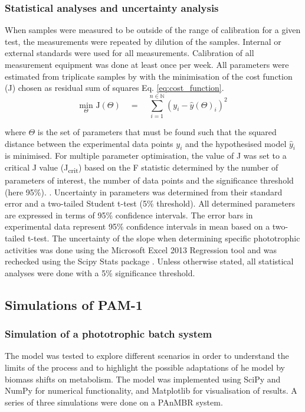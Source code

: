 \subsubsection{Statistical analyses and uncertainty analysis}
When samples were measured to be outside of the range of calibration for a given test, the measurements were repeated by dilution of the samples. Internal or external standards were used for all measurements. Calibration of all measurement equipment was done at least once per week. All parameters were estimated from triplicate samples by with the minimisation of the cost function (J) chosen as residual sum of squares Eq. \eqref{eq:cost_function}.
\begin{equation}
    \label{eq:cost_function}
    \underset{\Theta}{\mathrm{min}}\, \, \mathrm{J}(\Theta)\quad  = \quad \sum_{i = 1}^{n\in\mathbb{N}} \left(y_i - \hat{y}(\Theta)_i    \right)^2
\end{equation}

where $\Theta$ is the set of parameters that must be found such that the squared distance between the experimental data points $y_i$ and the hypothesised model $\hat{y}_i$ is minimised. For multiple parameter optimisation, the value of J was set to a critical J value (J\textsubscript{crit}) based on the F statistic determined by the number of parameters of interest, the number of data points and the significance threshold (here 95\%). \cite{Batstone2003}. Uncertainty in parameters was determined from their standard error and a two-tailed Student t-test (5\% threshold). All determined parameters are expressed in terms of 95\% confidence intervals. The error bars in experimental data represent 95\% confidence intervals in mean based on a two-tailed t-test. The uncertainty of the slope when determining specific phototrophic activities was done using the Microsoft Excel 2013 Regression tool and was rechecked using the Scipy Stats package \cite{Scipy2001}. Unless otherwise stated, all statistical analyses were done with a 5\% significance threshold.

\subsection{Simulations of PAM-1}

\subsubsection{Simulation of a phototrophic batch system}
The model was tested to explore different scenarios in order to understand the limits of the process and to highlight the possible adaptations of he model by biomass shifts on metabolism. The model was implemented using SciPy \cite{Scipy2001} and NumPy \cite{NumPy2011} for numerical functionality, and Matplotlib \cite{Hunter2007a} for visualisation of results. A series of three simulations were done on a PAnMBR system.

